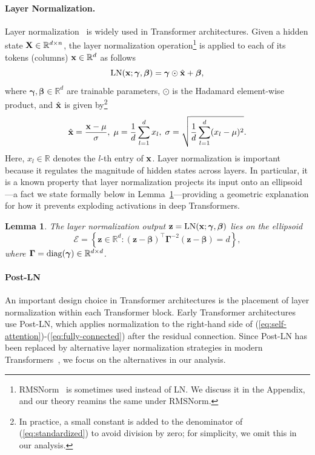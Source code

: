\documentclass[journal]{IEEEtran}
\def\eqref#1{equation~\ref{#1}}
\newcommand{\bfX}{{\bf X}}
\newcommand{\bfx}{{\bf x}}
\newcommand{\bfz}{{\bf z}}
\newcommand{\bfgamma}{{\boldsymbol \gamma}}
\newcommand{\bfGamma}{{\boldsymbol \Gamma}}
\newcommand{\bfbeta}{{\boldsymbol \beta}}
\renewcommand{\eqref}[1]{(\ref{#1})}
\theoremstyle{plain}
\newtheorem{lemma}[theorem]{Lemma}
\theoremstyle{definition}
\theoremstyle{remark}
\begin{document}
\paragraph{Layer Normalization.} Layer normalization~\cite{ba2016layernormalization} is widely used in Transformer architectures. Given a hidden state $\bfX \in \mathbb{R}^{d \times n}$, the layer normalization operation\footnote{RMSNorm~\cite{zhang2019root} is sometimes used instead of LN. We discuss it in the Appendix, and our theory reamins the same under RMSNorm.} is applied to each of its tokens (columns) $\bfx \in \mathbb{R}^{d}$ as follows
\begin{equation}\label{eq:LN}
    {\rm LN}(\bfx; \bfgamma, \bfbeta) = \bfgamma \odot \hat{\bfx} + \bfbeta,
\end{equation}
where $\bfgamma, \bfbeta \in \mathbb{R}^d$ are trainable parameters, $\odot$ is the Hadamard element-wise product, and $\hat{\bfx}$ is given by\footnote{In practice, a small constant is added to the denominator of (\ref{eq:standardized}) to avoid division by zero; for simplicity, we omit this in our analysis.}
\begin{equation}\label{eq:standardized}
    \hat{\bfx} = \frac{\bfx - \mu}{\sigma}, \; \mu = \frac{1}{d} \sum_{l=1}^d x_l, \; \sigma = \sqrt{\frac{1}{d} \sum_{l=1}^d (x_l - \mu)^2}.
\end{equation}
Here, $x_l \in \mathbb{R}$ denotes the $l$-th entry of $\bfx$. Layer normalization is important because it regulates the magnitude of hidden states across layers. In particular, it is a known property that layer normalization projects its input onto an ellipsoid—a fact we state formally below in Lemma~\ref{lemma:ellipsoid}—providing a geometric explanation for how it prevents exploding activations in deep Transformers.

\begin{lemma}\label{lemma:ellipsoid}
    The layer normalization output $\bfz=\text{LN}(\bfx; \bfgamma, \bfbeta)$ lies on the ellipsoid 
    $$
    \mathcal{E} = \left\{ \mathbf{z} \in \mathbb{R}^d : (\mathbf{z} - \bfbeta)^\top \bfGamma^{-2} (\mathbf{z} - \bfbeta) = d \right\}, 
    $$
    where $\bfGamma = {\rm diag}(\bfgamma)\in \mathbb{R}^{d\times d}$.
\end{lemma}

\paragraph{Post-LN} An important design choice in Transformer architectures is the placement of layer normalization within each Transformer block. Early Transformer architectures use Post-LN, which applies normalization to the right-hand side of \eqref{eq:self-attention}-\eqref{eq:fully-connected} after the residual connection. Since Post-LN has been replaced by alternative layer normalization strategies in modern Transformers~\cite{takase-etal-2023-b2t,naver2025periln}, we focus on the alternatives in our analysis.
\end{document}
